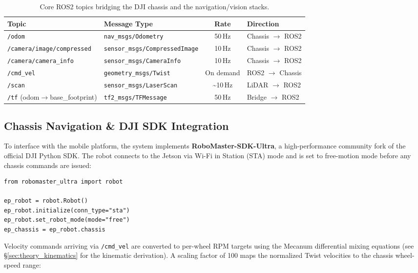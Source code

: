 \begin{table}[!htb]
  \footnotesize
  \centering
  \caption{Core ROS2 topics bridging the DJI chassis and the navigation/vision stacks.}
  \label{tab:ros2_topics}
  \begin{tabular}{@{}llcl@{}}
    \toprule
    \textbf{Topic} & \textbf{Message Type} & \textbf{Rate} & \textbf{Direction} \\
    \midrule
    \texttt{/odom} & \texttt{nav\_msgs/Odometry} & 50\,Hz & Chassis $\to$ ROS2 \\
    \texttt{/camera/image/compressed} & \texttt{sensor\_msgs/CompressedImage} & 10\,Hz & Chassis $\to$ ROS2 \\
    \texttt{/camera/camera\_info} & \texttt{sensor\_msgs/CameraInfo} & 10\,Hz & Chassis $\to$ ROS2 \\
    \texttt{/cmd\_vel} & \texttt{geometry\_msgs/Twist} & On demand & ROS2 $\to$ Chassis \\
    \texttt{/scan} & \texttt{sensor\_msgs/LaserScan} & \textasciitilde10\,Hz & LiDAR $\to$ ROS2 \\
    \texttt{/tf} (odom$\to$base\_footprint) & \texttt{tf2\_msgs/TFMessage} & 50\,Hz & Bridge $\to$ ROS2 \\
    \bottomrule
  \end{tabular}
\end{table}


\subsection{Chassis Navigation \& DJI SDK Integration}
\label{sec:dji-sdk}

To interface with the mobile platform, the system implements \textbf{RoboMaster-SDK-Ultra}, a high-performance community fork of the official DJI Python SDK. The robot connects to the Jetson via Wi-Fi in Station (STA) mode and is set to free-motion mode before any chassis commands are issued:

\begin{verbatim}
from robomaster_ultra import robot

ep_robot = robot.Robot()
ep_robot.initialize(conn_type="sta")
ep_robot.set_robot_mode(mode="free")
ep_chassis = ep_robot.chassis
\end{verbatim}

Velocity commands arriving via \texttt{/cmd\_vel} are converted to per-wheel RPM targets using the Mecanum differential mixing equations (see \S\ref{sec:theory_kinematics} for the kinematic derivation). A scaling factor of 100 maps the normalized Twist velocities to the chassis wheel-speed range:

